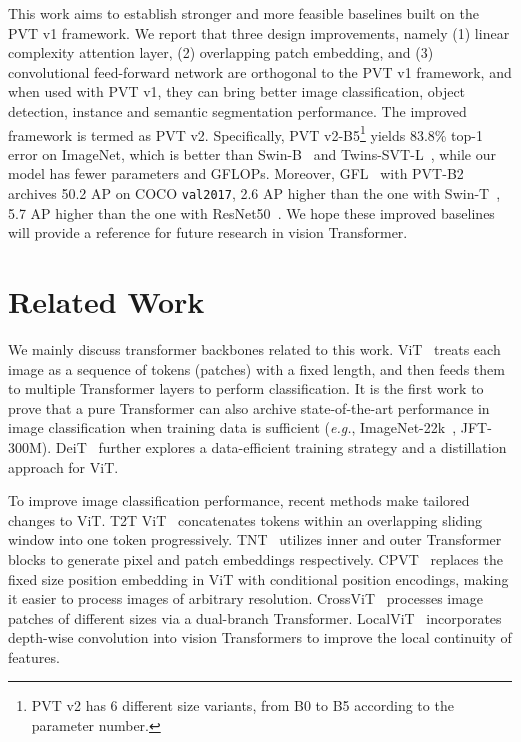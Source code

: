 \documentclass[10pt,twocolumn,letterpaper]{article}
\def\eg{\emph{e.g.}}
\begin{document}
	This work aims to establish stronger and more feasible baselines built on the PVT v1 framework.
We report that three design improvements, namely (1) linear complexity attention layer, (2) overlapping patch embedding, and (3) convolutional feed-forward network
	are orthogonal to the PVT v1 framework,
and when used with PVT v1, they can bring better image classification, object detection, instance and semantic segmentation performance.
The improved framework is termed as PVT v2.
Specifically, PVT v2-B5\footnote{
		PVT v2 has 6 different size variants, from B0 to B5 according to the parameter number.}
	yields 83.8\% top-1 error on ImageNet, which is better than Swin-B~\cite{swin} and Twins-SVT-L~\cite{twins}, while our model has fewer parameters and GFLOPs.
Moreover, GFL~\cite{li2020generalized} with PVT-B2 archives 50.2 AP on COCO \texttt{val2017}, 2.6 AP higher than the one with Swin-T~\cite{swin}, 5.7 AP higher than the one with ResNet50~\cite{he2015delving}.
We hope these improved baselines will provide a reference
	for future research in vision Transformer.
	
	\section{Related Work} 
	
	We mainly discuss transformer backbones related to this work.
	ViT~\cite{dosovitskiy2020image} treats each image as a sequence of tokens (patches) with a fixed length, and then feeds them to multiple Transformer layers to perform classification.
It is the first work to prove that a pure Transformer can also archive state-of-the-art performance in image classification when training data is sufficient (\eg, ImageNet-22k~\cite{deng2009imagenet}, JFT-300M).
DeiT~\cite{touvron2020training} further explores a data-efficient training strategy and a distillation approach for ViT.


	To improve image classification performance, recent methods make tailored changes to ViT.
T2T ViT~\cite{t2tvit} concatenates tokens within an overlapping sliding window into one token progressively.
TNT~\cite{tnt} utilizes inner and outer Transformer blocks to generate pixel and patch embeddings respectively.
CPVT~\cite{cpvt} replaces the fixed size position embedding in ViT with conditional position encodings, making it easier to process images of arbitrary resolution.
CrossViT~\cite{crossvit} processes image patches of different sizes via a dual-branch Transformer.
LocalViT~\cite{localvit} incorporates depth-wise convolution into vision Transformers to improve the local continuity of features.
	
\end{document}
